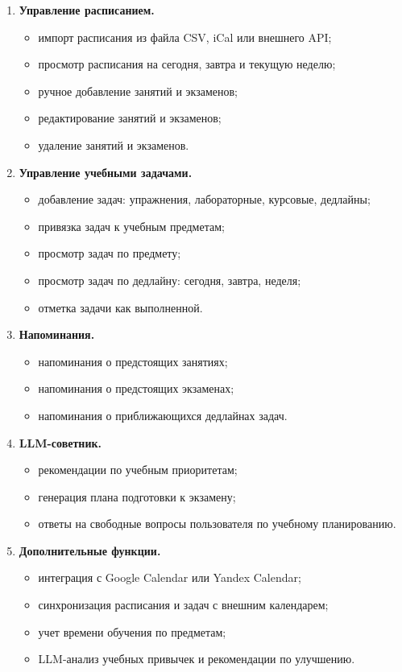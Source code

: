 \documentclass[10pt,a4paper,final]{article} %
\begin{document}
\begin{enumerate}
    \item \textbf{Управление расписанием.}
    \begin{itemize}
        \item импорт расписания из файла CSV, iCal или внешнего API;
        \item просмотр расписания на сегодня, завтра и текущую неделю;
        \item ручное добавление занятий и экзаменов;
        \item редактирование занятий и экзаменов;
        \item удаление занятий и экзаменов.
    \end{itemize}

    \item \textbf{Управление учебными задачами.}
    \begin{itemize}
        \item добавление задач: упражнения, лабораторные, курсовые, дедлайны;
        \item привязка задач к учебным предметам;
        \item просмотр задач по предмету;
        \item просмотр задач по дедлайну: сегодня, завтра, неделя;
        \item отметка задачи как выполненной.
    \end{itemize}

    \item \textbf{Напоминания.}
    \begin{itemize}
        \item напоминания о предстоящих занятиях;
        \item напоминания о предстоящих экзаменах;
        \item напоминания о приближающихся дедлайнах задач.
    \end{itemize}

    \item \textbf{LLM-советник.}
    \begin{itemize}
        \item рекомендации по учебным приоритетам;
        \item генерация плана подготовки к экзамену;
        \item ответы на свободные вопросы пользователя по учебному планированию.
    \end{itemize}

    \item \textbf{Дополнительные функции.}
    \begin{itemize}
        \item интеграция с Google Calendar или Yandex Calendar;
        \item синхронизация расписания и задач с внешним календарем;
        \item учет времени обучения по предметам;
        \item LLM-анализ учебных привычек и рекомендации по улучшению.
    \end{itemize}
\end{enumerate}
\end{document}
